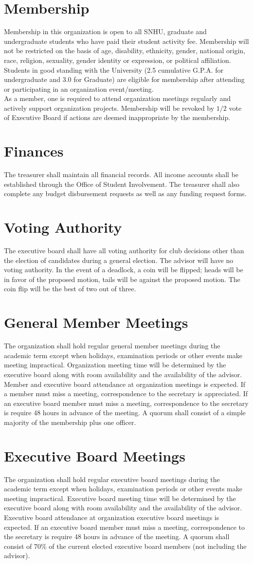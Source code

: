 \documentclass{article}
\newcommand{\article}[1]{\section{#1} \label{#1}}
\begin{document}
\article{Membership}
Membership in this organization is open to all SNHU, graduate and undergraduate students who have paid their student activity fee. 
Membership will not be restricted on the basis of age, disability, ethnicity, gender, national origin, race, religion, sexuality, gender identity or expression, or political affiliation. 
Students in good standing with the University (2.5 cumulative  G.P.A. for undergraduate and 3.0 for Graduate) are eligible for membership after attending or participating in an organization event/meeting.\\

As a member, one is required to attend organization meetings regularly and actively support organization projects. 
Membership will be revoked by $1/2$ vote of Executive Board if actions are deemed inappropriate by the membership.

\article{Finances}
The treasurer shall maintain all financial records. 
All income accounts shall be established through the Office of Student Involvement. 
The treasurer shall also complete any budget disbursement requests as well as any funding request forms.

\article{Voting Authority}
The executive board shall have all voting authority for club decisions other than the election of candidates during a general election. 
The advisor will have no voting authority. 
In the event of a deadlock, a coin will be flipped; heads will be in favor of the proposed motion, tails will be against the proposed motion. 
The coin flip will be the best of two out of three.

\article{General Member Meetings}
The organization shall hold regular general member meetings during the academic term except when holidays, examination periods or other events make meeting impractical. 
Organization meeting time will be determined by the executive board along with room availability and the availability of the advisor. 
Member and executive board attendance at organization meetings is expected. 
If a member must miss a meeting, correspondence to the secretary is appreciated. 
If an executive board member must miss a meeting, correspondence to the secretary is require 48 hours in advance of the meeting. 
A quorum shall consist of a simple majority of the membership plus one officer.
 
\article{Executive Board Meetings}
The organization shall hold regular executive board meetings during the academic term except when holidays, examination periods or other events make meeting impractical. 
Executive board meeting time will be determined by the executive board along with room availability and the availability of the advisor. 
Executive board attendance at organization executive board meetings is expected. 
If an executive board member must miss a meeting, correspondence to the secretary is require 48 hours in advance of the meeting. 
A quorum shall consist of 70\% of the current elected executive board members (not including the advisor). 
 
\end{document}
